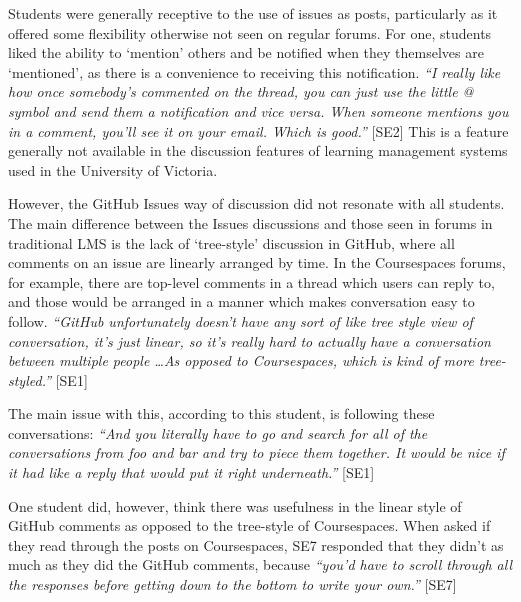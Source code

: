 Students were generally receptive to the use of issues as posts, particularly as it offered some flexibility otherwise not seen on regular forums. For one, students liked the ability to `mention' others and be notified when they themselves are `mentioned', as there is a convenience to receiving this notification. \textit{``I really like how once somebody's commented on the thread, you can just use the little @ symbol and send them a notification and vice versa. When someone mentions you in a comment, you'll see it on your email. Which is good.''} [SE2] This is a feature generally not available in the discussion features of learning management systems used in the University of Victoria.

However, the GitHub Issues way of discussion did not resonate with all students. The main difference between the Issues discussions and those seen in forums in traditional LMS is the lack of `tree-style' discussion in GitHub, where all comments on an issue are linearly arranged by time. In the Coursespaces forums, for example, there are top-level comments in a thread which users can reply to, and those would be arranged in a manner which makes conversation easy to follow. \textit{``GitHub unfortunately doesn't have any sort of like tree style view of conversation, it's just linear, so it's really hard to actually have a conversation between multiple people \ldots As opposed to Coursespaces, which is kind of more tree-styled.''} [SE1]

The main issue with this, according to this student, is following these conversations: \textit{``And you literally have to go and search for all of the conversations from foo and bar and try to piece them together. It would be nice if it had like a reply that would put it right underneath.''} [SE1]


One student did, however, think there was usefulness in the linear style of GitHub comments as opposed to the tree-style of Coursespaces. When asked if they read through the posts on Coursespaces, SE7 responded that they didn't as much as they did the GitHub comments, because \textit{``you'd have to scroll through all the responses before getting down to the bottom to write your own.''} [SE7] %

